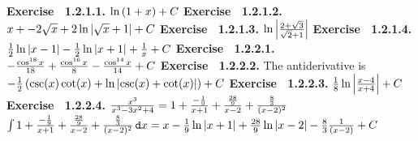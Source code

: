 \par 
 {\noindent \protect \bf  Exercise ~1.2.1.1.} $\protect \qopname  \relax o{ln}\left (1+x\right )+C$ \protect \newline  \protect \newline  
 {\noindent \protect \bf  Exercise ~1.2.1.2.} $x+ -2\protect \sqrt  {x}+2\protect \qopname  \relax o{ln}{|\protect \sqrt  {x}+1|}+C$ \protect \newline  \protect \newline  
 {\noindent \protect \bf  Exercise ~1.2.1.3.} $\protect \qopname  \relax o{ln}\left | \protect \frac  { 2+\protect \sqrt  {3}}{\protect \sqrt  {2} +1} \right |$ \protect \newline  \protect \newline  
 {\noindent \protect \bf  Exercise ~1.2.1.4.} $\protect \frac  {1}{2}\protect \qopname  \relax o{ln}{|x-1|}-\protect \frac  {1}{2}\protect \qopname  \relax o{ln}{|x+1|} +\protect \frac  {1}{x} +C$ \protect \newline  \protect \newline  
 {\noindent \protect \bf  Exercise ~1.2.2.1.} $-\protect \frac  {\protect \qopname  \relax o{cos}^{18}{x}}{18}+ \protect \frac  {\protect \qopname  \relax o{cos}^{16}{x}}{8} - \protect \frac  {\protect \qopname  \relax o{cos}^{14}{x}}{14} + C$ \protect \newline  \protect \newline  
 {\noindent \protect \bf  Exercise ~1.2.2.2.} The antiderivative is $-\protect \frac  {1}{2}\left (\protect \qopname  \relax o{csc}(x)\protect \qopname  \relax o{cot}(x)+\protect \qopname  \relax o{ln}\left |\protect \qopname  \relax o{csc}(x)+\protect \qopname  \relax o{cot}(x)\right |\right )+C$ \protect \newline  \protect \newline  
 {\noindent \protect \bf  Exercise ~1.2.2.3.} $\protect \frac  {1}{8} \protect \qopname  \relax o{ln}\left | \protect \frac  {x-4}{x+4} \right | + C$ \protect \newline  \protect \newline  
 {\noindent \protect \bf  Exercise ~1.2.2.4.} \textbullet $ \protect \frac  {x^3}{x^3-3x^2+4} = 1 + \protect \frac  { -\protect \frac  {1}{9}}{x+1} + \protect \frac  {\protect \frac  {28}{9}}{x-2} + \protect \frac  {\protect \frac  {8}{3}}{(x-2)^2} $ \protect \newline  \textbullet $ \intop {1 + \protect \frac  { -\protect \frac  {1}{9}}{x+1} + \protect \frac  {\protect \frac  {28}{9}}{x-2} + \protect \frac  {\protect \frac  {8}{3}}{(x-2)^2} \mathop {}\protect \tmspace  -\thinmuskip {.1667em}\protect \mathtt  {d}x} = x -\protect \frac  {1}{9} \protect \qopname  \relax o{ln}{|x+1|} + \protect \frac  {28}{9} \protect \qopname  \relax o{ln}{|x-2|} - \protect \frac  {8}{3} \protect \frac  {1}{(x-2)} + C$  \protect \newline  \protect \newline  
